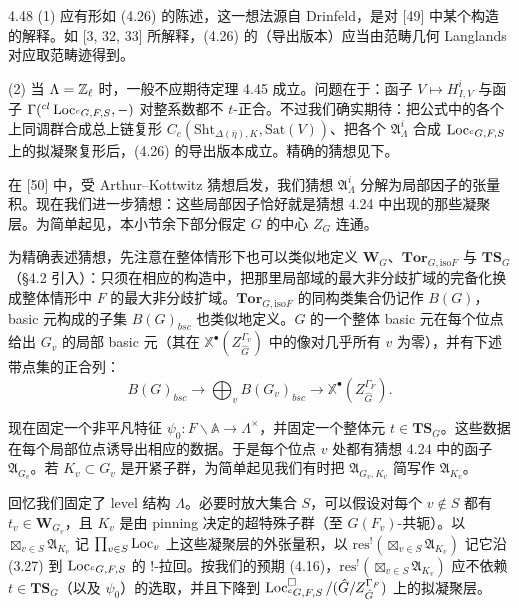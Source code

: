 \begin{rem}{4.48}\label{thm:a2-4-48}
(1) 应有形如 (4.26) 的陈述，这一想法源自 Drinfeld，是对 [49] 中某个构造的解释。如 [3, 32, 33] 所解释，(4.26) 的（导出版本）应当由范畴几何 Langlands 对应取范畴迹得到。

(2) 当 $\Lambda=\mathbb{Z}_\ell$ 时，一般不应期待定理 4.45 成立。问题在于：函子 $V\mapsto H^i_{I,V}$ 与函子 $\Gamma({}^{cl}\operatorname{Loc}_{{}^{c}G,F,S},-)$ 对整系数都不 $t$-正合。不过我们确实期待：把公式中的各个上同调群合成总上链复形 $C_c(\mathrm{Sht}_{\Delta(\bar\eta),K},\mathrm{Sat}(V))$、把各个 $\mathfrak A^i_\Lambda$ 合成 $\operatorname{Loc}_{{}^{c}G,F,S}$ 上的拟凝聚复形后，(4.26) 的导出版本成立。精确的猜想见下。
\end{rem}

在 [50] 中，受 Arthur–Kottwitz 猜想启发，我们猜想 $\mathfrak A^i_\Lambda$ 分解为局部因子的张量积。现在我们进一步猜想：这些局部因子恰好就是猜想 4.24 中出现的那些凝聚层。为简单起见，本小节余下部分假定 $G$ 的中心 $Z_G$ 连通。

为精确表述猜想，先注意在整体情形下也可以类似地定义 $\mathbf W_G$、$\mathbf{Tor}_{G,\mathrm{iso}F}$ 与 $\mathbf{TS}_G$（§4.2 引入）：只须在相应的构造中，把那里局部域的最大非分歧扩域的完备化换成整体情形中 $F$ 的最大非分歧扩域。$\mathbf{Tor}_{G,\mathrm{iso}F}$ 的同构类集合仍记作 $B(G)$，basic 元构成的子集 $B(G)_{bsc}$ 也类似地定义。$G$ 的一个整体 basic 元在每个位点给出 $G_v$ 的局部 basic 元（其在 $\mathbb X^{\bullet}(Z^{\Gamma_v}_{\hat G})$ 中的像对几乎所有 $v$ 为零），并有下述带点集的正合列：
\[
B(G)_{bsc}\to\bigoplus_v B(G_v)_{bsc}\to\mathbb X^{\bullet}(Z^{\Gamma_F}_{\hat G}).
\]

现在固定一个非平凡特征 $\psi_0:F\backslash\mathbb A\to\Lambda^\times$，并固定一个整体元 $t\in\mathbf{TS}_G$。这些数据在每个局部位点诱导出相应的数据。于是每个位点 $v$ 处都有猜想 4.24 中的函子 $\mathfrak A_{G_v}$。若 $K_v\subset G_v$ 是开紧子群，为简单起见我们有时把 $\mathfrak A_{G_v,K_v}$ 简写作 $\mathfrak A_{K_v}$。

回忆我们固定了 level 结构 $\Lambda$。必要时放大集合 $S$，可以假设对每个 $v\notin S$ 都有 $t_v\in\mathbf W_{G_v}$，且 $K_v$ 是由 pinning 决定的超特殊子群（至 $G(F_v)$-共轭）。以 $\boxtimes_{v\in S}\mathfrak A_{K_v}$ 记 $\prod_{v\in S}\operatorname{Loc}_v$ 上这些凝聚层的外张量积，以 $\mathrm{res}^!(\boxtimes_{v\in S}\mathfrak A_{K_v})$ 记它沿 (3.27) 到 $\operatorname{Loc}_{{}^{c}G,F,S}$ 的 !-拉回。按我们的预期 (4.16)，$\mathrm{res}^!(\boxtimes_{v\in S}\mathfrak A_{K_v})$ 应不依赖 $t\in\mathbf{TS}_G$（以及 $\psi_0$）的选取，并且下降到 $\operatorname{Loc}^{\square}_{{}^{c}G,F,S}/(\hat G/Z^{\Gamma_F}_{\hat G})$ 上的拟凝聚层。

